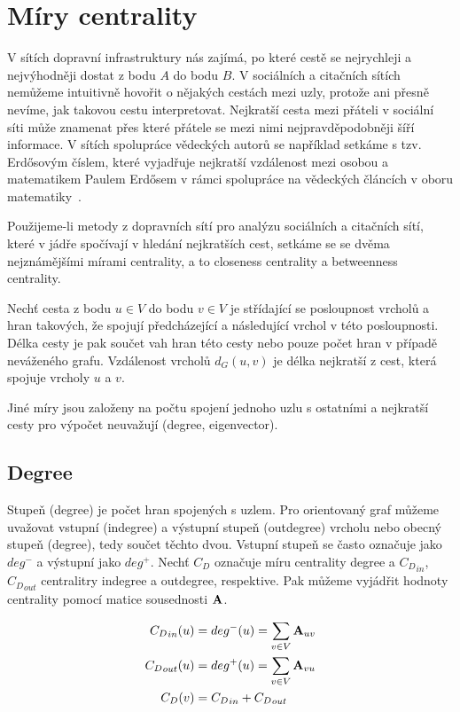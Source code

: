\documentclass{bakalarka}
\begin{document}
\section{Míry centrality}
V sítích dopravní infrastruktury nás zajímá, po které cestě se nejrychleji a
nejvýhodněji dostat z bodu $A$ do bodu $B$. V sociálních a citačních sítích
nemůžeme intuitivně hovořit o nějakých cestách mezi uzly, protože ani přesně
nevíme, jak takovou cestu interpretovat. Nejkratší cesta mezi přáteli v
sociální síti může znamenat přes které přátele se mezi nimi nejpravděpodobněji
šíří informace. V sítích spolupráce vědeckých autorů se například setkáme s
tzv. Erdősovým číslem, které vyjadřuje nejkratší vzdálenost mezi osobou a
matematikem Paulem Erdősem v rámci spolupráce na vědeckých článcích v oboru
matematiky~\citep{barabasi2005}.

Použijeme-li metody z dopravních sítí pro analýzu sociálních a citačních sítí,
které v jádře spočívají v hledání nejkratších cest, setkáme se se dvěma
nejznámějšími mírami centrality, a to closeness centrality a betweenness
centrality.

Nechť cesta z bodu $u \in V$ do bodu $v \in V$ je střídající se posloupnost
vrcholů a hran takových, že spojují předcházející a následující vrchol v této
posloupnosti. Délka cesty je pak součet vah hran této cesty nebo pouze počet
hran v případě neváženého grafu. Vzdálenost vrcholů $d_G(u, v)$ je délka
nejkratší z cest, která spojuje vrcholy $u$ a $v$.

Jiné míry jsou založeny na počtu spojení jednoho uzlu s ostatními a nejkratší
cesty pro výpočet neuvažují (degree, eigenvector).


\subsection{Degree}
Stupeň (degree) je počet hran spojených s uzlem. Pro orientovaný graf můžeme
uvažovat vstupní (indegree) a výstupní stupeň (outdegree) vrcholu nebo obecný
stupeň (degree), tedy součet těchto dvou. Vstupní stupeň se často označuje jako
$deg^-$ a výstupní jako $deg^+$. Nechť $C_D$ označuje míru centrality degree a
${C_D}_{in}$, ${C_D}_{out}$ centralitry indegree a outdegree, respektive. Pak
můžeme vyjádřit hodnoty centrality pomocí matice sousednosti ${\bf A}$.

\begin{align}
\label{eq:degree}
{C_D}_{in}(u) &= deg^-(u)  = \displaystyle\sum\limits_{v \in V} {\bf A}_{uv} \\
{C_D}_{out}(u) &= deg^+(u) = \displaystyle\sum\limits_{v \in V} {\bf A}_{vu} \\
{C_D}(v) &= {C_D}_{in} + {C_D}_{out}
\end{align}
\end{document}
